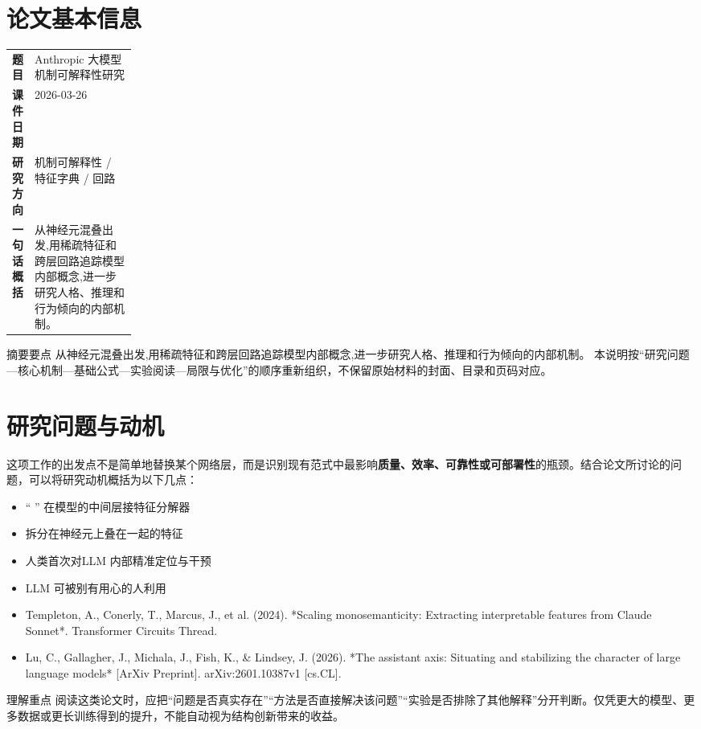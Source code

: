 \documentclass[UTF8,11pt,a4paper]{ctexart}
\newcommand{\term}[1]{\textbf{\textcolor{mainblue}{#1}}}
\begin{document}
\section{论文基本信息}
\begin{center}
\begin{tabularx}{0.94\linewidth}{>{\bfseries}p{0.18\linewidth}X}
\toprule
题目 & Anthropic 大模型机制可解释性研究\\
课件日期 & 2026-03-26\\
研究方向 & 机制可解释性 / 特征字典 / 回路\\
一句话概括 & 从神经元混叠出发,用稀疏特征和跨层回路追踪模型内部概念,进一步研究人格、推理和行为倾向的内部机制。\\
\bottomrule
\end{tabularx}
\end{center}

\begin{infobox}{摘要要点}
从神经元混叠出发,用稀疏特征和跨层回路追踪模型内部概念,进一步研究人格、推理和行为倾向的内部机制。 本说明按“研究问题—核心机制—基础公式—实验阅读—局限与优化”的顺序重新组织，不保留原始材料的封面、目录和页码对应。
\end{infobox}

\section{研究问题与动机}
这项工作的出发点不是简单地替换某个网络层，而是识别现有范式中最影响\term{质量、效率、可靠性或可部署性}的瓶颈。结合论文所讨论的问题，可以将研究动机概括为以下几点：
\begin{itemize}
\item “ ” 在模型的中间层接特征分解器
\item 拆分在神经元上叠在一起的特征
\item 人类首次对LLM 内部精准定位与干预
\item LLM 可被别有用心的人利用
\item Templeton, A., Conerly, T., Marcus, J., et al. (2024). *Scaling monosemanticity: Extracting interpretable features from Claude Sonnet*. Transformer Circuits Thread.
\item Lu, C., Gallagher, J., Michala, J., Fish, K., \& Lindsey, J. (2026). *The assistant axis: Situating and stabilizing the character of large language models* [ArXiv Preprint]. arXiv:2601.10387v1 [cs.CL].
\end{itemize}

\begin{notebox}{理解重点}
阅读这类论文时，应把“问题是否真实存在”“方法是否直接解决该问题”“实验是否排除了其他解释”分开判断。仅凭更大的模型、更多数据或更长训练得到的提升，不能自动视为结构创新带来的收益。
\end{notebox}
\end{document}
